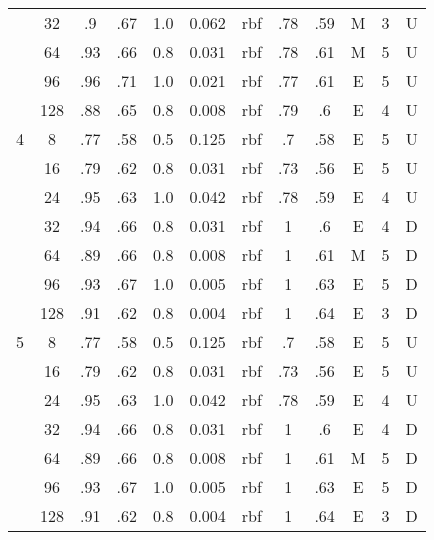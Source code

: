 \begin{table}
\begin{tabular}{|c|c|ccccc||ccccc|}
  &  32 &    .9 &  .67 & 1.0 &    0.062 &    rbf &   .78 &  .59 &      M & 3 &       U \\
  &  64 &   .93 &  .66 & 0.8 &    0.031 &    rbf &   .78 &  .61 &      M & 5 &       U \\
  &  96 &   .96 &  .71 & 1.0 &    0.021 &    rbf &   .77 &  .61 &      E & 5 &       U \\
  & 128 &   .88 &  .65 & 0.8 &    0.008 &    rbf &   .79 &   .6 &      E & 4 &       U \\\hline
4 &   8 &   .77 &  .58 & 0.5 &    0.125 &    rbf &    .7 &  .58 &      E & 5 &       U \\
  &  16 &   .79 &  .62 & 0.8 &    0.031 &    rbf &   .73 &  .56 &      E & 5 &       U \\
  &  24 &   .95 &  .63 & 1.0 &    0.042 &    rbf &   .78 &  .59 &      E & 4 &       U \\
  &  32 &   .94 &  .66 & 0.8 &    0.031 &    rbf &     1 &   .6 &      E & 4 &       D \\
  &  64 &   .89 &  .66 & 0.8 &    0.008 &    rbf &     1 &  .61 &      M & 5 &       D \\
  &  96 &   .93 &  .67 & 1.0 &    0.005 &    rbf &     1 &  .63 &      E & 5 &       D \\
  & 128 &   .91 &  .62 & 0.8 &    0.004 &    rbf &     1 &  .64 &      E & 3 &       D \\\hline
5 &   8 &   .77 &  .58 & 0.5 &    0.125 &    rbf &    .7 &  .58 &      E & 5 &       U \\
  &  16 &   .79 &  .62 & 0.8 &    0.031 &    rbf &   .73 &  .56 &      E & 5 &       U \\
  &  24 &   .95 &  .63 & 1.0 &    0.042 &    rbf &   .78 &  .59 &      E & 4 &       U \\
  &  32 &   .94 &  .66 & 0.8 &    0.031 &    rbf &     1 &   .6 &      E & 4 &       D \\
  &  64 &   .89 &  .66 & 0.8 &    0.008 &    rbf &     1 &  .61 &      M & 5 &       D \\
  &  96 &   .93 &  .67 & 1.0 &    0.005 &    rbf &     1 &  .63 &      E & 5 &       D \\
  & 128 &   .91 &  .62 & 0.8 &    0.004 &    rbf &     1 &  .64 &      E & 3 &       D \\\hline
\end{tabular}
\end{table}
